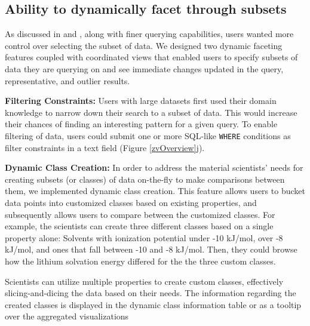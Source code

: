 \subsection{Ability to dynamically facet through subsets}
\par As discussed in \cite{Amar2005} and \cite{Heer2012}, along with finer querying capabilities, users wanted more control over selecting the subset of data. We designed two dynamic faceting features coupled with coordinated views \cite{Heer2012} that enabled users to specify subsets of data they are querying on and see immediate changes updated in the query, representative, and outlier results. 
\par \textbf{Filtering Constraints:} Users with large datasets first used their domain knowledge to narrow down their search to a subset of data. This would increase their chances of finding an interesting pattern for a given query. To enable filtering of data, users could submit one or more SQL-like \texttt{WHERE} conditions as filter constraints in a text field (Figure \ref{zvOverview}j).  
\par \textbf{Dynamic Class Creation:} In order to address the material scientists' needs for creating subsets (or classes) of data on-the-fly to make comparisons between them, we implemented dynamic class creation. This feature allows users to bucket data points into customized classes based on existing properties, and subsequently allows users to compare between the customized classes. For example, the scientists can create three different classes based on a single property alone: Solvents with ionization potential under -10 kJ/mol, over -8 kJ/mol, and ones that fall between -10 and -8 kJ/mol. Then, they could browse how the lithium solvation energy differed for the the three custom classes. 
\par Scientists can utilize multiple properties to create custom classes, effectively slicing-and-dicing the data based on their needs. The information regarding the created classes is displayed in the dynamic class information table or as a tooltip over the aggregated visualizations
